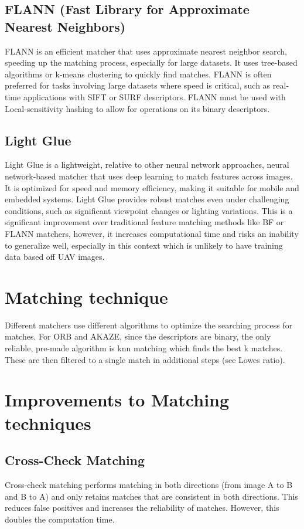 \subsection*{FLANN (Fast Library for Approximate Nearest Neighbors)} FLANN is an efficient matcher that uses approximate nearest neighbor search, speeding up the matching process, especially for large datasets. It uses tree-based algorithms or k-means clustering to quickly find matches. FLANN is often preferred for tasks involving large datasets where speed is critical, such as real-time applications with SIFT or SURF descriptors. FLANN must be used with Local-sensitivity hashing to allow for operations on its binary descriptors. 

\subsection*{Light Glue} Light Glue is a lightweight, relative to other neural network approaches, neural network-based matcher that uses deep learning to match features across images. It is optimized for speed and memory efficiency, making it suitable for mobile and embedded systems. Light Glue provides robust matches even under challenging conditions, such as significant viewpoint changes or lighting variations. This is a significant improvement over traditional feature matching methods like BF or FLANN matchers, however, it increases computational time and risks an inability to generalize well, especially in this context which is unlikely to have training data based off UAV images.

\section*{Matching technique}
Different matchers use different algorithms to optimize the searching process for matches. For ORB and AKAZE, since the descriptors are binary, the only reliable, pre-made algorithm is knn matching which finds the best k matches. These are then filtered to a single match in additional steps (see Lowes ratio). 

\section*{Improvements to Matching techniques}
\subsection*{Cross-Check Matching} Cross-check matching performs matching in both directions (from image A to B and B to A) and only retains matches that are consistent in both directions. This reduces false positives and increases the reliability of matches. However, this doubles the computation time.

